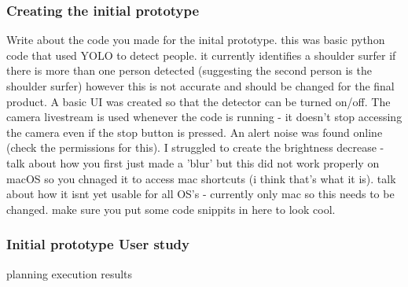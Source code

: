 \documentclass[12pt]{article}
\theoremstyle{plain}
\theoremstyle{definition}
\begin{document}
\subsubsection{Creating the initial prototype}
Write about the code you made for the inital prototype. this was basic python code that used YOLO to detect people. it currently identifies a shoulder surfer if there is more than one person detected (suggesting the second person is the shoulder surfer) however this is not accurate and should be changed for the final product. A basic UI was created so that the detector can be turned on/off. The camera livestream is used whenever the code is running - it doesn't stop accessing the camera even if the stop button is pressed. An alert noise was found online (check the permissions for this). I struggled to create the brightness decrease - talk about how you first just made a 'blur' but this did not work properly on macOS so you chnaged it to access mac shortcuts (i think that's what it is). talk about how it isnt yet usable for all OS's - currently only mac so this needs to be changed. make sure you put some code snippits in here to look cool.



\subsubsection{Initial prototype User study}
planning
execution
results

\printbibliography

\clearpage\appendix
\end{document}
